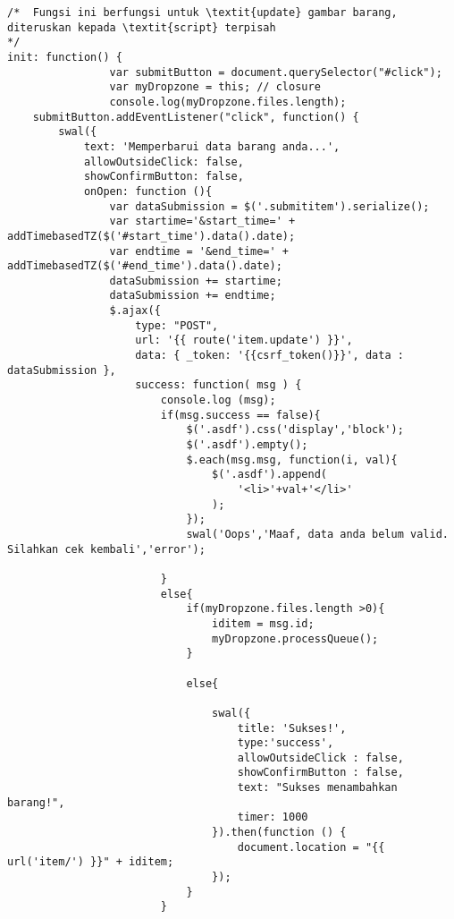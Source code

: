 \begin{lstlisting}[label=cdjq.03-02,style=htmlcssjs,caption=Kode Sumber \textit{View} Memperbarui Barang]
/*	Fungsi ini berfungsi untuk \textit{update} gambar barang, diteruskan kepada \textit{script} terpisah 
*/
init: function() {
                var submitButton = document.querySelector("#click");
                var myDropzone = this; // closure
                console.log(myDropzone.files.length);
	submitButton.addEventListener("click", function() {
	    swal({
	        text: 'Memperbarui data barang anda...',
	        allowOutsideClick: false,
	        showConfirmButton: false,
	        onOpen: function (){
	            var dataSubmission = $('.submititem').serialize();
	            var startime='&start_time=' + addTimebasedTZ($('#start_time').data().date);
	            var endtime = '&end_time=' + addTimebasedTZ($('#end_time').data().date);
	            dataSubmission += startime;
	            dataSubmission += endtime;
	            $.ajax({
	                type: "POST",
	                url: '{{ route('item.update') }}',
	                data: { _token: '{{csrf_token()}}', data : dataSubmission },
	                success: function( msg ) {
	                    console.log (msg);
	                    if(msg.success == false){
	                        $('.asdf').css('display','block');
	                        $('.asdf').empty();
	                        $.each(msg.msg, function(i, val){
	                            $('.asdf').append(
	                                '<li>'+val+'</li>'
	                            );
	                        });
	                        swal('Oops','Maaf, data anda belum valid. Silahkan cek kembali','error');

	                    }
	                    else{
	                        if(myDropzone.files.length >0){
	                            iditem = msg.id;
	                            myDropzone.processQueue();
	                        }

	                        else{

	                            swal({
	                                title: 'Sukses!',
	                                type:'success',
	                                allowOutsideClick : false,
	                                showConfirmButton : false,
	                                text: "Sukses menambahkan barang!",
	                                timer: 1000
	                            }).then(function () {
	                                document.location = "{{ url('item/') }}" + iditem;
	                            });
	                        }
	                    }


\end{lstlisting}
